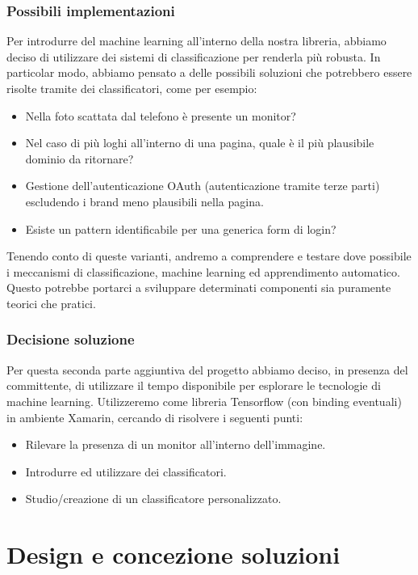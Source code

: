 \documentclass[twoside]{supsistudent}
\newcommand{\Decaa}{\newline\vspace{0.5mm}\newline\noindent}
\begin{document}
\subsection{Possibili implementazioni}
Per introdurre del machine learning all'interno della nostra libreria, abbiamo deciso di utilizzare dei sistemi di classificazione per renderla più robusta.
\Decaa
In particolar modo, abbiamo pensato a delle possibili soluzioni che potrebbero essere risolte tramite dei classificatori, come per esempio:

\begin{itemize}
\item Nella foto scattata dal telefono è presente un monitor?
\item Nel caso di più loghi all'interno di una pagina, quale è il più plausibile dominio da ritornare?
\item Gestione dell'autenticazione OAuth\cite{oauth} (autenticazione tramite terze parti) escludendo i brand meno plausibili nella pagina.
\item Esiste un pattern identificabile per una generica form di login?
\end{itemize}

Tenendo conto di queste varianti, andremo a comprendere e testare dove possibile i meccanismi di classificazione, machine learning ed apprendimento automatico. Questo potrebbe portarci a sviluppare determinati componenti sia puramente teorici che pratici.

\subsection{Decisione soluzione }
Per questa seconda parte aggiuntiva del progetto abbiamo deciso, in presenza del committente, di utilizzare il tempo disponibile per esplorare le tecnologie di machine learning. Utilizzeremo come libreria Tensorflow (con binding eventuali) in ambiente Xamarin, cercando di risolvere i seguenti punti:
\begin{itemize}
\item Rilevare la presenza di un monitor all'interno dell'immagine.
\item Introdurre ed utilizzare dei classificatori.
\item Studio/creazione di un classificatore personalizzato.
\end{itemize}

\chapter{Design e concezione soluzioni}
\end{document}
